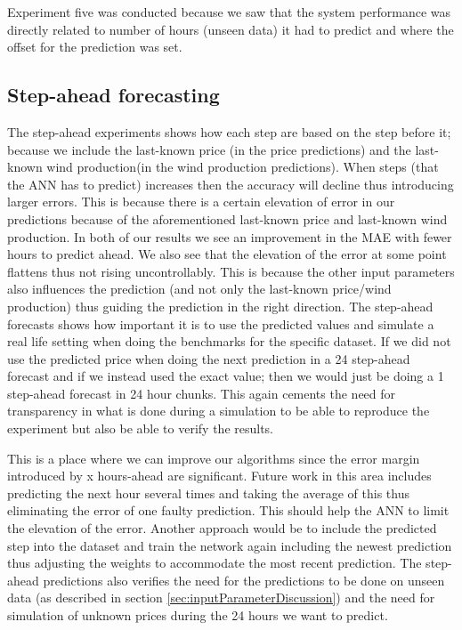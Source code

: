 Experiment five was conducted because we saw that the system performance was directly related to number of hours (unseen data) it had to predict and where the offset for the prediction was set.
\subsection{Step-ahead forecasting}
\label{sec:stepAheadDiscussion}
The step-ahead experiments shows how each step are based on the step before it; because we include the last-known price (in the price predictions) and the last-known wind production(in the wind production predictions). When steps (that the ANN has to predict) increases then the accuracy will decline thus introducing larger errors. This is because there is a certain elevation of error in our predictions because of the aforementioned last-known price and last-known wind production. In both of our results we see an improvement in the MAE with fewer hours to predict ahead. We also see that the elevation of the error at some point flattens thus not rising uncontrollably. This is because the other input parameters also influences the prediction (and not only the last-known price/wind production) thus guiding the prediction in the right direction. The step-ahead forecasts shows how important it is to use the predicted values and simulate a real life setting when doing the benchmarks for the specific dataset. If we did not use the predicted price when doing the next prediction in a 24 step-ahead forecast and if we instead used the exact value; then we would just be doing a 1 step-ahead forecast in 24 hour chunks. This again cements the need for transparency in what is done during a simulation to be able to reproduce the experiment but also be able to verify the results.

This is a place where we can improve our algorithms since the error margin introduced by x hours-ahead are significant. Future work in this area includes predicting the next hour several times and taking the average of this thus eliminating the error of one faulty prediction. This should help the ANN to limit the elevation of the error. Another approach would be to include the predicted step into the dataset and train the network again including the newest prediction thus adjusting the weights to accommodate the most recent prediction. The step-ahead predictions also verifies the need for the predictions to be done on unseen data (as described in section \ref{sec:inputParameterDiscussion}) and the need for simulation of unknown prices during the 24 hours we want to predict. 

